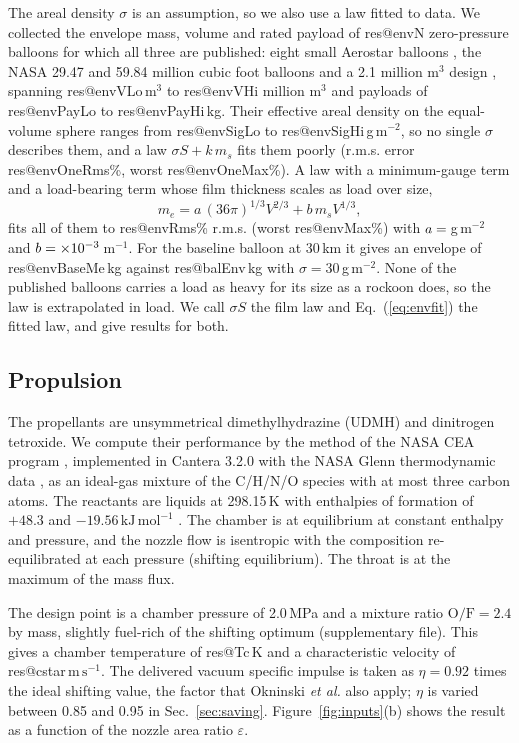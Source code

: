 \documentclass[11pt,a4paper]{article}
\makeatletter
\newcommand{\R}[1]{\csname res@#1\endcsname}
\newcommand{\ms}{\,\mathrm{m\,s^{-1}}}
\makeatother
\begin{document}
The areal density $\sigma$ is an assumption, so we also use a law fitted to data. We collected the envelope mass, volume and rated payload of \R{envN} zero-pressure balloons for which all three are published: eight small Aerostar balloons \cite{aerostar2005}, the NASA 29.47 and 59.84 million cubic foot balloons \cite{nasaldb} and a 2.1 million m$^3$ design \cite{rainwater2004}, spanning \R{envVLo}\,m$^3$ to \R{envVHi} million m$^3$ and payloads of \R{envPayLo} to \R{envPayHi}\,kg. Their effective areal density on the equal-volume sphere ranges from \R{envSigLo} to \R{envSigHi}\,g\,m$^{-2}$, so no single $\sigma$ describes them, and a law $\sigma S+k\,m_s$ fits them poorly (r.m.s. error \R{envOneRms}\%, worst \R{envOneMax}\%). A law with a minimum-gauge term and a load-bearing term whose film thickness scales as load over size,
\begin{equation}
m_e=a\,(36\pi)^{1/3}V^{2/3}+b\,m_sV^{1/3},
\label{eq:envfit}
\end{equation}
fits all of them to \R{envRms}\% r.m.s. (worst \R{envMax}\%) with $a=\R{envA}$\,g\,m$^{-2}$ and $b=\R{envB}\times10^{-3}$\,m$^{-1}$. For the baseline balloon at 30\,km it gives an envelope of \R{envBaseMe}\,kg against \R{balEnv}\,kg with $\sigma=30$\,g\,m$^{-2}$. None of the published balloons carries a load as heavy for its size as a rockoon does, so the law is extrapolated in load. We call $\sigma S$ the film law and Eq.~(\ref{eq:envfit}) the fitted law, and give results for both.

\subsection{Propulsion}
\label{sec:prop}

The propellants are unsymmetrical dimethylhydrazine (UDMH) and dinitrogen tetroxide. We compute their performance by the method of the NASA CEA program \cite{gordon1994}, implemented in Cantera 3.2.0 \cite{cantera} with the NASA Glenn thermodynamic data \cite{mcbride2002}, as an ideal-gas mixture of the C/H/N/O species with at most three carbon atoms. The reactants are liquids at 298.15\,K with enthalpies of formation of $+48.3$ and $-19.56\,\mathrm{kJ\,mol^{-1}}$ \cite{nist}. The chamber is at equilibrium at constant enthalpy and pressure, and the nozzle flow is isentropic with the composition re-equilibrated at each pressure (shifting equilibrium). The throat is at the maximum of the mass flux.

The design point is a chamber pressure of 2.0\,MPa and a mixture ratio $\mathrm{O/F}=2.4$ by mass, slightly fuel-rich of the shifting optimum (supplementary file). This gives a chamber temperature of \R{Tc}\,K and a characteristic velocity of \R{cstar}$\ms$. The delivered vacuum specific impulse is taken as $\eta=0.92$ times the ideal shifting value, the factor that Okninski \emph{et al.} \cite{okninski2016} also apply; $\eta$ is varied between 0.85 and 0.95 in Sec.~\ref{sec:saving}. Figure~\ref{fig:inputs}(b) shows the result as a function of the nozzle area ratio $\varepsilon$.
\end{document}
